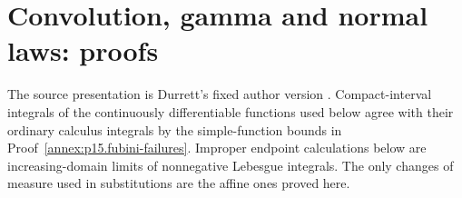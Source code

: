 \section{Convolution, gamma and normal laws: proofs}
\label{sec:annex-p15-convolution-gamma-normal}

The source presentation is Durrett's fixed author version
\cite[pp.~33--34, 49--52]{DurrettPTEAuthor2019}.
Compact-interval integrals of the continuously differentiable functions
used below agree with their ordinary calculus integrals by the
simple-function bounds in Proof~\ref{annex:p15.fubini-failures}.
Improper endpoint calculations below are increasing-domain limits of
nonnegative Lebesgue integrals. The only changes of measure used in
substitutions are the affine ones proved here.

